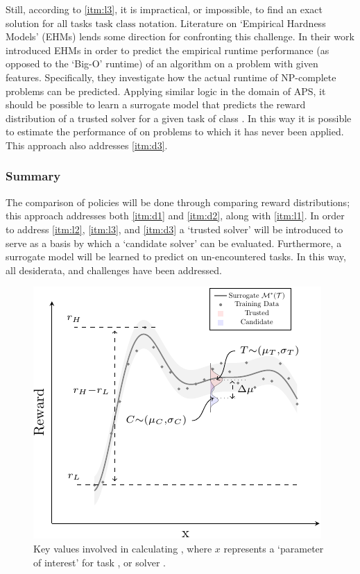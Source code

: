         Still, according to \ref{itm:l3}, it is impractical, or impossible, to find an exact solution for all tasks $\text{task class notation}$. Literature on `Empirical Hardness Models' (EHMs) lends some direction for confronting this challenge. In their work \cite{Leyton-Brown2009-yr,Hutter2009-og} introduced EHMs in order to predict the empirical runtime performance (as opposed to the `Big-O' runtime) of an algorithm on a problem with given features. Specifically, they investigate how the actual runtime of NP-complete problems can be predicted. Applying similar logic in the domain of APS, it should be possible to learn a surrogate model \surrogate{} that predicts the reward distribution \rwdstarapprox{} of a trusted solver \solvestar{} for a given task \task{} of class \taskclass. In this way it is possible to estimate the performance of \solvestar{} on problems to which it has never been applied. This approach also addresses \ref{itm:d3}.
        
    \subsubsection{Summary} The comparison of policies will be done through comparing reward distributions; this approach addresses both \ref{itm:d1} and \ref{itm:d2}, along with \ref{itm:l1}. In order to address \ref{itm:l2}, \ref{itm:l3}, and \ref{itm:d3} a `trusted solver' \solvestar{} will be introduced to serve as a basis by which a `candidate solver' \solve{} can be evaluated. Furthermore, a surrogate model \surrogate{} will be learned to predict \rwdstarapprox{} on un-encountered tasks. In this way, all desiderata, and challenges have been addressed.
        
   \begin{figure}[tb]
        \centering
        \includegraphics[width=0.9\linewidth]{Figures/sq_v2_fig-crop}
        \caption{Key values involved in calculating \xQ, where $x$ represents a `parameter of interest' for task \task, or solver \solve.}
        \label{fig:sq_v2}
        \vspace{-0.2cm}
    \end{figure}
